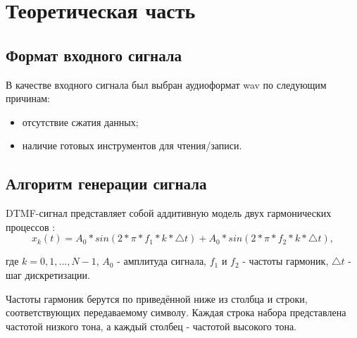 \chapter{Теоретическая часть} \label{ch1}

\section{Формат входного сигнала}

В качестве входного сигнала был выбран аудиоформат wav по следующим причинам:
\begin{itemize}
	\item отсутствие сжатия данных;
	\item наличие готовых инструментов для чтения/записи.
\end{itemize}


\section{Алгоритм генерации сигнала}

DTMF-сигнал представляет собой аддитивную модель двух гармонических процессов \cite{dtmf}:
\begin{equation}
	x_{k}(t) = A_{0} * sin(2*\pi*f_{1}*k*\triangle{t}) + A_{0} * sin(2*\pi*f_{2}*k*\triangle{t}),
\end{equation}

где $k=0,1,...,N-1$, $A_{0}$ - амплитуда сигнала, $f_{1}$ и $f_{2}$ - частоты гармоник, $\triangle{t}$ - шаг дискретизации.

Частоты гармоник берутся по приведённой ниже  из столбца и строки, соответствующих передаваемому символу. Каждая строка набора представлена частотой низкого тона, а каждый столбец - частотой высокого тона.

